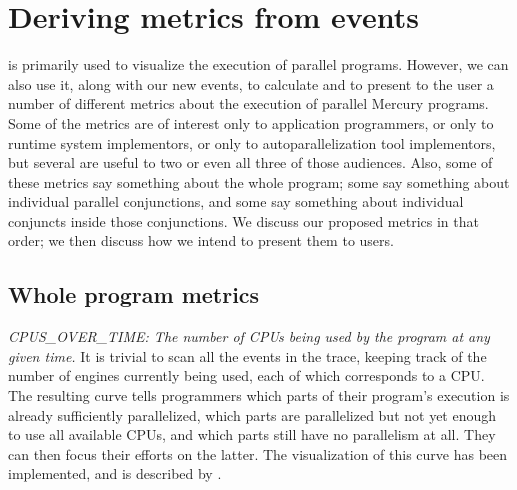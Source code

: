 \section{Deriving metrics from events}
\label{sec:analysis}

\tscope is primarily used to visualize the execution of parallel programs.
However, we can also use it, along with our new events,
to calculate and to present to the user
a number of different metrics about the execution of parallel Mercury programs.
Some of the metrics are of interest
only to application programmers,
or only to runtime system implementors,
or only to autoparallelization tool implementors,
but several are useful to two or even all three of those audiences.
Also, some of these metrics say something about the whole program;
some say something about individual parallel conjunctions,
and some say something about individual conjuncts inside those conjunctions.
We discuss our proposed metrics in that order;
we then discuss how we intend to present them to users.

% 

\subsection{Whole program metrics}



\emph{CPUS\_OVER\_TIME:
The number of CPUs being used by the program at any given time.}
It is trivial to scan all the events in the trace,
keeping track of the number of engines currently being used,
each of which corresponds to a CPU.
The resulting curve tells programmers
which parts of their program's execution is already sufficiently parallelized,
which parts are parallelized but not yet enough to use all available CPUs,
and which parts still have no parallelism at all.
They can then focus their efforts on the latter.
The visualization of this curve has been implemented,
and is described by \citet{threadscope}.

